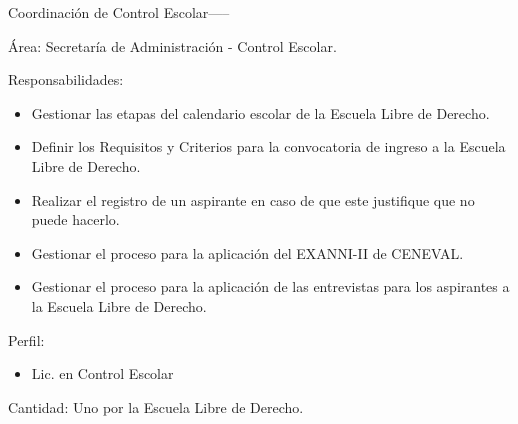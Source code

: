 \begin{actor}{Coordinación de Control Escolar}{-----}
	
	\item[Área:] Secretaría de Administración - Control Escolar.
	
	\item[Responsabilidades:] \hspace{1pt}
	    \begin{itemize}
	    	\item Gestionar las etapas del calendario escolar de la Escuela Libre de Derecho.
	        \item Definir los Requisitos y Criterios para la convocatoria de ingreso a la Escuela Libre de Derecho.
	        \item Realizar el registro de un aspirante en caso de que este justifique que no puede hacerlo.
	        \item Gestionar el proceso para la aplicación del EXANNI-II de CENEVAL.
	        \item Gestionar el proceso para la aplicación de las entrevistas para los aspirantes a la Escuela Libre de Derecho.
	    \end{itemize}
	\item[Perfil:] \hspace{1pt}
	\begin{itemize}
		\item Lic. en Control Escolar
	\end{itemize}
	\item[Cantidad:] Uno por la Escuela Libre de Derecho.
\end{actor}


